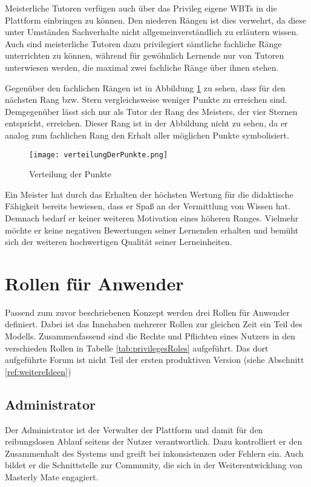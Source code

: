Meisterliche Tutoren verfügen auch über das Privileg eigene WBTs in die
Plattform einbringen zu können. Den niederen Rängen ist dies verwehrt, da diese
unter Umständen Sachverhalte nicht allgemeinverständlich zu erläutern wissen.
Auch sind meisterliche Tutoren dazu privilegiert sämtliche fachliche Ränge
unterrichten zu können, während für gewöhnlich Lernende nur von Tutoren
unterwiesen werden, die maximal zwei fachliche Ränge über ihnen stehen.

Gegenüber den fachlichen Rängen ist in Abbildung \ref{ref:vertPunkt} zu sehen,
dass für den nächsten Rang bzw. Stern vergleichsweise weniger Punkte zu
erreichen sind. Demgegenüber lässt sich nur als Tutor der Rang des Meisters, der
vier Sternen entspricht, erreichen. Dieser Rang ist in der Abbildung nicht zu
sehen, da er analog zum fachlichen Rang den Erhalt aller möglichen Punkte
symbolisiert.
\begin{figure}[H] \texttt{[image: verteilungDerPunkte.png]}
\caption{Verteilung der Punkte}\label{ref:vertPunkt}
\end{figure}
Ein Meister hat durch das Erhalten der höchsten Wertung für die didaktische
Fähigkeit bereits bewiesen, dass er Spaß an der Vermittlung von Wissen hat.
Demnach bedarf er keiner weiteren Motivation eines höheren Ranges.
Vielmehr möchte er keine negativen Bewertungen seiner Lernenden erhalten und
bemüht sich der weiteren hochwertigen Qualität seiner Lerneinheiten.

\section{Rollen für Anwender}
Passend zum zuvor beschriebenen Konzept werden drei Rollen für Anwender
definiert. Dabei ist das Innehaben mehrerer Rollen zur gleichen Zeit ein Teil
des Modells. Zusammenfassend sind die Rechte und Pflichten eines Nutzers in den
verschieden Rollen in Tabelle \ref{tab:privilegesRoles} aufgeführt. Das dort
aufgeführte Forum ist nicht Teil der ersten produktiven Version (siehe
Abschnitt \ref{ref:weitereIdeen})

\subsection{Administrator}
Der Administrator ist der Verwalter der Plattform und damit für den
reibungslosen Ablauf seitens der Nutzer verantwortlich. Dazu kontrolliert er den
Zusammenhalt des Systems und greift bei inkonsistenzen oder Fehlern ein. Auch
bildet er die Schnittstelle zur Community, die sich in der Weiterentwicklung von
Masterly Mate engagiert.

